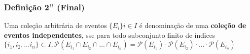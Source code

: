 \documentclass[a4paper]{article}
\begin{document}
	\subsubsection{Definição 2'' (Final)}
	
	Uma coleção arbitrária de eventos $\{E_{i}\} i \in I$ é denominação de uma \textbf{coleção de eventos independentes}, sse para todo subconjunto finito de índices $\{i_{1}, i_{2}, \dots i_{n}\} \subset I, \mathcal{P}(E_{i_{1}} \cap E_{i_{2}} \cap \dots \cap E_{i_{n}}) = \mathcal{P}(E_{i_{1}}) \cdot \mathcal{P}(E_{i_{2}}) \cdot \dots \cdot \mathcal{P}(E_{i_{n}})$
		
	
		
	
\end{document}
